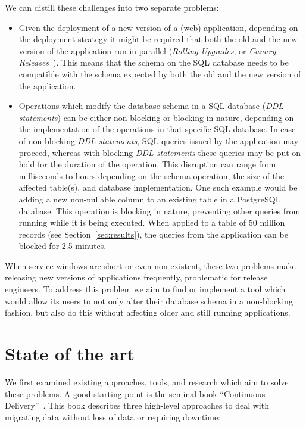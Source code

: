 \documentclass[conference]{IEEEtran}
\begin{document}
We can distill these challenges into two separate problems:
\begin{itemize}
  \item{Given the deployment of a new version of a (web) application, depending on the deployment strategy it might be required that both the old and the new version of the application run in parallel (\textit{Rolling Upgrades}, or \textit{Canary Releases}~\cite{Humble:2010:CDR:1869904}). This means that the schema on the SQL database needs to be compatible with the schema expected by both the old and the new version of the application.}
  \item{Operations which modify the database schema in a SQL database (\textit{DDL statements}) can be either non-blocking or blocking in nature, depending on the implementation of the operations in that specific SQL database. In case of non-blocking \textit{DDL statements}, SQL queries issued by the application may proceed, whereas with blocking \textit{DDL statements} these queries may be put on hold for the duration of the operation. This disruption can range from milliseconds to hours depending on the schema operation, the size of the affected table(s), and database implementation. One such example would be adding a new non-nullable column to an existing table in a PostgreSQL database. This operation is blocking in nature, preventing other queries from running while it is being executed. When applied to a table of 50 million records (see Section~\ref{sec:results}), the queries from the application can be blocked for 2.5 minutes.}
\end{itemize}

When service windows are short or even non-existent, these two problems make releasing new versions of applications frequently, problematic for release engineers. To address this problem we aim to find or implement a tool which would allow its users to not only alter their database schema in a non-blocking fashion, but also do this without affecting older and still running applications.

\section{State of the art} %


We first examined existing approaches, tools, and research which aim to solve these problems. A good starting point is the seminal book ``Continuous Delivery''~\cite{Humble:2010:CDR:1869904}. This book describes three high-level approaches to deal with migrating data without loss of data or requiring downtime:
\end{document}
